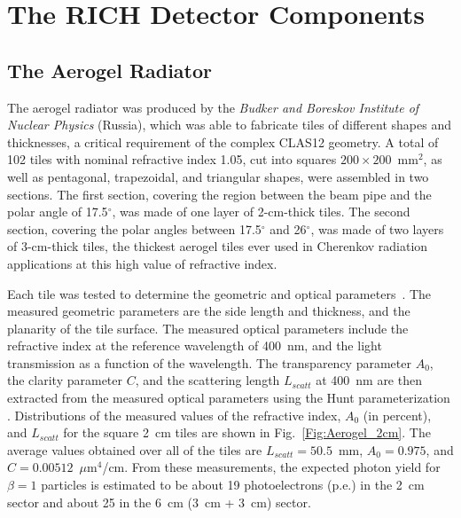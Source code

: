 \documentclass[5p,times,twocolumn]{elsarticle}
\begin{document}

\section{The RICH Detector Components}

\subsection{The Aerogel Radiator}

The aerogel radiator was produced by the {\it Budker and Boreskov Institute of Nuclear Physics} (Russia), which was
able to fabricate tiles of different shapes and thicknesses, a critical requirement of the complex CLAS12 geometry.
A total of 102 tiles with nominal refractive index 1.05, cut into squares $200 \times 200$~mm$^2$, as well as
pentagonal, trapezoidal, and triangular shapes, were assembled in two sections. The first section, covering the region
between the beam pipe and the polar angle of 17.5$^\circ$, was made of one layer of 2-cm-thick tiles. The second
section, covering the polar angles between 17.5$^\circ$ and 26$^\circ$, was made of two layers of 3-cm-thick tiles, the
thickest aerogel tiles ever used in Cherenkov radiation applications at this high value of refractive index.

Each tile was tested to determine the geometric and optical parameters~\cite{REF:RICH2016mc}. The measured
geometric parameters are the side length and thickness, and the planarity of the tile surface. The measured optical
parameters include the refractive index at the reference wavelength of 400~nm, and the light transmission as a
function of the wavelength. The transparency parameter $A_0$, the clarity parameter $C$, and the scattering length
$L_{scatt}$ at 400~nm are then extracted from the measured optical parameters using the Hunt parameterization
\cite{REF:Hunt}. Distributions of the measured values of the refractive index, $A_0$ (in percent), and $L_{scatt}$ for the
square 2~cm tiles are shown in Fig.~\ref{Fig:Aerogel_2cm}. The average values obtained over all of the tiles are
$L_{scatt} = 50.5$~mm, $A_0 = 0.975$, and $C = 0.00512$~$\mu$m$^4$/cm. From these measurements, the expected
photon yield for $\beta=1$ particles is estimated to be about 19 photoelectrons (p.e.) in the 2~cm sector and about 25
in the 6~cm (3~cm + 3~cm) sector.
\end{document}
